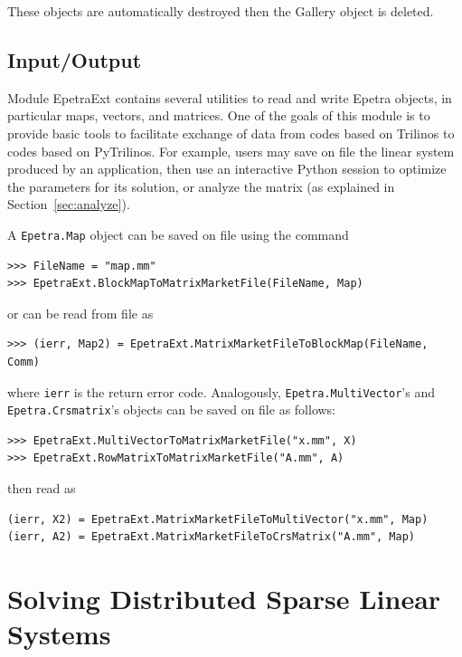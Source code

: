 \documentclass[10pt,relax]{SANDreport}
\begin{document}
These objects are automatically destroyed then the Gallery object is deleted.

\subsection{Input/Output}
\label{sec:io}

Module EpetraExt contains several utilities to read and write Epetra objects,
  in particular maps, vectors, and matrices. One of the goals of this module
  is to provide basic tools to facilitate exchange of data from codes based on
  Trilinos to codes based on PyTrilinos. For example, users may save on file
  the linear system produced by an application, then use an interactive Python
  session to optimize the parameters for its solution, or analyze the matrix
  (as explained in Section~\ref{sec:analyze}).

A {\tt Epetra.Map} object can be saved on file using the command
\begin{verbatim}
>>> FileName = "map.mm"
>>> EpetraExt.BlockMapToMatrixMarketFile(FileName, Map)
\end{verbatim}
or can be read from file as
\begin{verbatim}
>>> (ierr, Map2) = EpetraExt.MatrixMarketFileToBlockMap(FileName, Comm)
\end{verbatim}
where \verb!ierr! is the return error code. Analogously, 
\verb!Epetra.MultiVector!'s and \verb!Epetra.Crsmatrix!'s objects
can be saved on file as follows:
\begin{verbatim}
>>> EpetraExt.MultiVectorToMatrixMarketFile("x.mm", X)
>>> EpetraExt.RowMatrixToMatrixMarketFile("A.mm", A)
\end{verbatim}
then read as
\begin{verbatim}
(ierr, X2) = EpetraExt.MatrixMarketFileToMultiVector("x.mm", Map)
(ierr, A2) = EpetraExt.MatrixMarketFileToCrsMatrix("A.mm", Map)
\end{verbatim}

\section{Solving Distributed Sparse Linear Systems}
\label{sec:linear}
\end{document}
